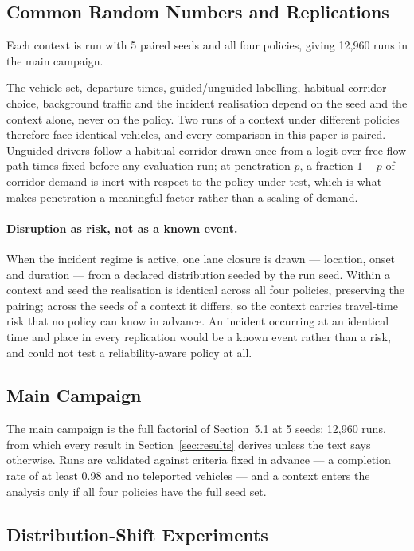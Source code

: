 \documentclass[runningheads]{llncs}
\begin{document}
\subsection{Common Random Numbers and Replications}

Each context is run with 5 paired seeds and all four policies, giving
12{,}960 runs in the main campaign.

The vehicle set, departure times, guided/unguided labelling, habitual corridor
choice, background traffic and the incident realisation depend on the seed and
the context alone, never on the policy. Two runs of a context under different
policies therefore face identical vehicles, and every comparison in this paper
is paired. Unguided drivers follow a habitual corridor drawn once from a logit
over free-flow path times fixed before any evaluation run; at penetration $p$, a
fraction $1-p$ of corridor demand is inert with respect to the policy under
test, which is what makes penetration a meaningful factor rather than a scaling
of demand.

\paragraph{Disruption as risk, not as a known event.} When the incident regime
is active, one lane closure is drawn --- location, onset and duration --- from a
declared distribution seeded by the run seed. Within a context and seed the
realisation is identical across all four policies, preserving the pairing;
across the seeds of a context it differs, so the context carries travel-time
risk that no policy can know in advance. An incident occurring at an identical
time and place in every replication would be a known event rather than a risk,
and could not test a reliability-aware policy at all.

\subsection{Main Campaign}

The main campaign is the full factorial of Section~5.1 at 5 seeds:
12{,}960 runs, from which every result in Section~\ref{sec:results}
derives unless the text says otherwise. Runs are validated against criteria
fixed in advance --- a completion rate of at least 0.98 and no teleported
vehicles --- and a context enters the analysis only if all four policies have
the full seed set.

\subsection{Distribution-Shift Experiments}
\end{document}
